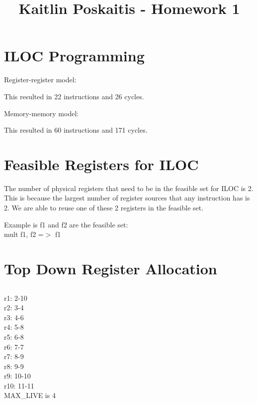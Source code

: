 \documentclass[11pt]{article}
\title{\bf Kaitlin Poskaitis - Homework 1}
\author{}
\date{}
\begin{document}
\maketitle

\section{ILOC Programming}

Register-register model:

This resulted in 22 instructions and 26 cycles.

\vspace{5mm}

Memory-memory model:

This resulted in 60 instructions and 171 cycles.

\section{Feasible Registers for ILOC}
The number of physical registers that need to be in the feasible set for ILOC is
2.  This is because the largest number of register sources that any instruction
has is 2. We are able to reuse one of these 2 registers in the feasible set.

\noindent Example is f1 and f2 are the feasible set:\\
mult f1, f2 =$>$ f1

\section{Top Down Register Allocation}
\subsection{}


\vspace{5mm}
\subsection{}
\noindent r1:  2-10\\
r2:  3-4\\
r3:  4-6\\
r4:  5-8\\
r5:  6-8\\
r6:  7-7\\
r7:  8-9\\
r8:  9-9\\
r9:  10-10\\
r10: 11-11\\
MAX\_LIVE is 4
\end{document}
